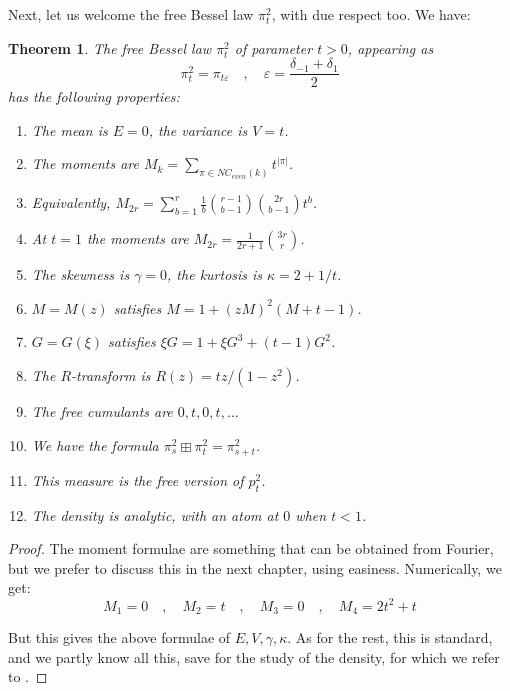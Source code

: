 \documentclass[12pt]{amsbook}
\newtheorem{theorem}{Theorem}[chapter]
\begin{document}
Next, let us welcome the free Bessel law $\pi_t^2$, with due respect too. We have:

\begin{theorem}
The free Bessel law $\pi_t^2$ of parameter $t>0$, appearing as
$$\pi_t^2=\pi_{t\varepsilon}\quad,\quad\varepsilon=\frac{\delta_{-1}+\delta_1}{2}$$
has the following properties:
\begin{enumerate}
\item The mean is $E=0$, the variance is $V=t$.

\item The moments are $M_k=\sum_{\pi\in NC_{even}(k)}t^{|\pi|}$.

\item Equivalently, $M_{2r}=\sum_{b=1}^r\frac{1}{b}\binom{r-1}{b-1}\binom{2r}{b-1}t^b$.

\item At $t=1$ the moments are $M_{2r}=\frac{1}{2r+1}\binom{3r}{r}$.

\item The skewness is $\gamma=0$, the kurtosis is $\kappa=2+1/t$.

\item $M=M(z)$ satisfies $M=1+(zM)^2(M+t-1)$.

\item $G=G(\xi)$ satisfies $\xi G=1+\xi G^3+(t-1)G^2$.

\item The $R$-transform is $R(z)=tz/(1-z^2)$.

\item The free cumulants are $0,t,0,t,\ldots$

\item We have the formula $\pi^2_s\boxplus\pi^2_t=\pi^2_{s+t}$.

\item This measure is the free version of $p_t^2$.

\item The density is analytic, with an atom at $0$ when $t<1$.
\end{enumerate}
\end{theorem}

\begin{proof}
The moment formulae are something that can be obtained from Fourier, but we prefer to discuss this in the next chapter, using easiness. Numerically, we get:
$$M_1=0\quad,\quad 
M_2=t\quad,\quad
M_3=0\quad,\quad
M_4=2t^2+t$$

But this gives the above formulae of $E,V,\gamma,\kappa$. As for the rest, this is standard, and we partly know all this, save for the study of the density, for which we refer to \cite{bb+}.
\end{proof}
\end{document}
